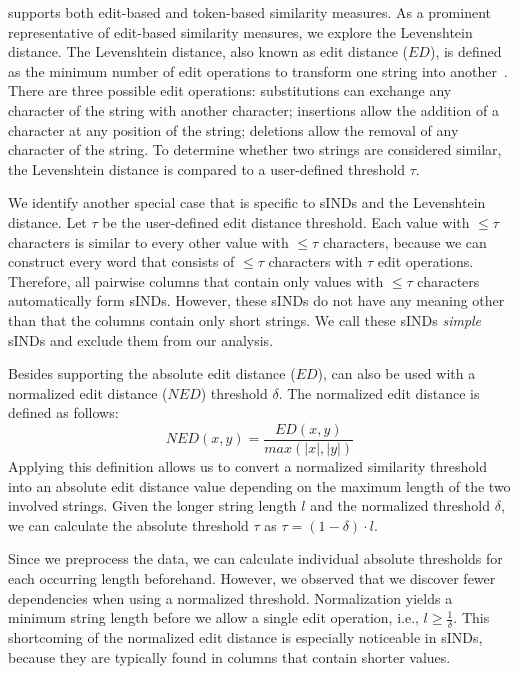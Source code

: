 \sawfish supports both edit-based and token-based similarity measures.
As a prominent representative of edit-based similarity measures, we explore the Levenshtein distance.
The Levenshtein distance, also known as edit distance ($ED$), is defined as the minimum number of edit operations to transform one string into another~\cite{levenshtein1966binary}.
There are three possible edit operations: substitutions can exchange any character of the string with another character; insertions allow the addition of a character at any position of the string; deletions allow the removal of any character of the string.
To determine whether two strings are considered similar, the Levenshtein distance is compared to a user-defined threshold $\tau$.

We identify another special case that is specific to sINDs and the Levenshtein distance.
Let $\tau$ be the user-defined edit distance threshold.
Each value with $\leq \tau$ characters is similar to every other value with $\leq \tau$ characters, because we can construct every word that consists of $\leq \tau$ characters with $\tau$ edit operations.
Therefore, all pairwise columns that contain only values with $\leq \tau$ characters automatically form sINDs.
However, these sINDs do not have any meaning other than that the columns contain only short strings.
We call these sINDs \emph{simple} sINDs and exclude them from our analysis.



Besides supporting the absolute edit distance ($ED$), \sawfish can also be used with a normalized edit distance ($NED$) threshold $\delta$.
The normalized edit distance is defined as follows:
\begin{equation*}
    NED(x, y) = \frac{ED(x, y)}{max(|x|, |y|)}
\end{equation*}
Applying this definition allows us to convert a normalized similarity threshold into an absolute edit distance value depending on the maximum length of the two involved strings.
Given the longer string length $l$ and the normalized threshold $\delta$, we can calculate the absolute threshold $\tau$ as $\tau = (1 - \delta) \cdot l$.

Since we preprocess the data, we can calculate individual absolute thresholds for each occurring length beforehand.
However, we observed that we discover fewer dependencies when using a normalized threshold.
Normalization yields a minimum string length before we allow a single edit operation, i.e., $l \geq \frac{1}{\delta}$.
This shortcoming of the normalized edit distance is especially noticeable in sINDs, because they are typically found in columns that contain shorter values.

